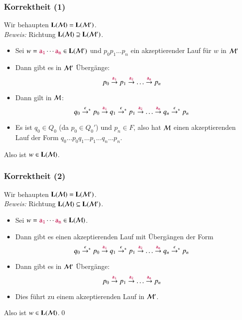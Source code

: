 \documentclass[onlymath]{beamer}
\begin{document}
\begin{frame}

\end{frame}

\begin{frame}[t]\frametitle{Korrektheit (1)}

Wir behaupten $\textbf{\textcolor{black}{L}}(\mathcal{M})=\textbf{\textcolor{black}{L}}(\mathcal{M}')$.\\[1ex]

\emph{Beweis:} Richtung $\textbf{\textcolor{black}{L}}(\mathcal{M})\supseteq\textbf{\textcolor{black}{L}}(\mathcal{M}')$.\pause

\begin{itemize}
\item Sei $w=\mathtt{\textcolor{purple}{a_1}}\cdots\mathtt{\textcolor{purple}{a_n}}\in \textbf{\textcolor{black}{L}}(\mathcal{M'})$ und $p_0p_1\ldots p_n$ ein akzeptierender Lauf für $w$ in $\mathcal{M'}$\pause
\item Dann gibt es in $\mathcal{M}'$ Übergänge:
\[ p_0\stackrel{\mathtt{\textcolor{purple}{a_1}}}{\to}p_1\stackrel{\mathtt{\textcolor{purple}{a_2}}}{\to}\ldots\stackrel{\mathtt{\textcolor{purple}{a_n}}}{\to}p_n\]\pause
\item Dann gilt in $\mathcal{M}$:
\[ q_0\mathrel{\mathord{\stackrel{\epsilon}{\to}}{}^*} p_0\stackrel{\mathtt{\textcolor{purple}{a_1}}}{\to}q_1\mathrel{\mathord{\stackrel{\epsilon}{\to}}{}^*} p_1\stackrel{\mathtt{\textcolor{purple}{a_2}}}{\to}\ldots\stackrel{\mathtt{\textcolor{purple}{a_n}}}{\to}q_n\mathrel{\mathord{\stackrel{\epsilon}{\to}}{}^*} p_n\]\pause
\item Es ist $q_0\in Q_0$ (da $p_0\in Q_0'$) und $p_n\in F$, also hat $\mathcal{M}$ einen akzeptierenden Lauf der Form $q_0\ldots p_0q_1\ldots p_1\ldots q_n\ldots p_n$.\pause
\end{itemize}
Also ist $w\in\textbf{\textcolor{black}{L}}(\mathcal{M})$.

\end{frame}

\begin{frame}[t]\frametitle{Korrektheit (2)}

Wir behaupten $\textbf{\textcolor{black}{L}}(\mathcal{M})=\textbf{\textcolor{black}{L}}(\mathcal{M}')$.\\[1ex]

\emph{Beweis:} Richtung $\textbf{\textcolor{black}{L}}(\mathcal{M})\subseteq\textbf{\textcolor{black}{L}}(\mathcal{M}')$.

\begin{itemize}
\item Sei $w=\mathtt{\textcolor{purple}{a_1}}\cdots\mathtt{\textcolor{purple}{a_n}}\in \textbf{\textcolor{black}{L}}(\mathcal{M})$.
\item Dann gibt es einen akzeptierenden Lauf mit Übergängen der Form
\[ q_0\mathrel{\mathord{\stackrel{\epsilon}{\to}}{}^*} p_0\stackrel{\mathtt{\textcolor{purple}{a_1}}}{\to}q_1\mathrel{\mathord{\stackrel{\epsilon}{\to}}{}^*} p_1\stackrel{\mathtt{\textcolor{purple}{a_2}}}{\to}\ldots\stackrel{\mathtt{\textcolor{purple}{a_n}}}{\to}q_n\mathrel{\mathord{\stackrel{\epsilon}{\to}}{}^*} p_n\]
\item Dann gibt es in $\mathcal{M}'$ Übergänge:
\[ p_0\stackrel{\mathtt{\textcolor{purple}{a_1}}}{\to}p_1\stackrel{\mathtt{\textcolor{purple}{a_2}}}{\to}\ldots\stackrel{\mathtt{\textcolor{purple}{a_n}}}{\to}p_n\]
\item Dies führt zu einem akzeptierenden Lauf in $\mathcal{M}'$.
\end{itemize}
Also ist $w\in\textbf{\textcolor{black}{L}}(\mathcal{M})$.\qed

\end{frame}
\end{document}
